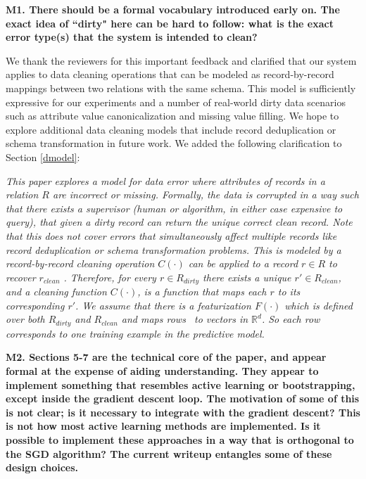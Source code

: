 \vspace{0.5em}

\noindent\noindent \textbf{M1. There should be a formal vocabulary introduced early on. The exact idea of ``dirty" here can be hard to follow: what is the exact error type(s) that the system is intended to clean?}

\vspace{0.5em}

We thank the reviewers for this important feedback and clarified that our system applies to data cleaning operations that can be modeled as record-by-record mappings between two relations with the same schema.
This model is sufficiently expressive for our experiments and a number of real-world dirty data scenarios such as attribute value canonicalization and missing value filling.
We hope to explore additional data cleaning models that include record deduplication or schema transformation in future work.
We added the following clarification to Section \ref{dmodel}:

\emph{This paper explores a model for data error where attributes of records in a relation $R$ are incorrect or missing.
Formally, the data is corrupted in a way such that there exists a supervisor (human or algorithm, in either case expensive to query), that given a dirty record can return the unique correct clean record.
Note that this does not cover errors that simultaneously affect multiple records like record deduplication or schema transformation problems.
This is modeled by a record-by-record cleaning operation $C(\cdot)$ can be applied to a record $r \in R$ to recover $r_{clean}$ .
Therefore, for every $r \in R_{dirty}$ there exists a unique $r' \in R_{clean}$, and a cleaning function $C(\cdot)$, is a function that maps each $r$ to its corresponding $r'$.
We assume that there is a featurization $F(\cdot)$ which is defined over both $R_{dirty}$ and $R_{clean}$ and maps rows~ to vectors in $\mathbb{R}^d$.
So each row~ corresponds to one training example in the predictive model.}

\vspace{0.5em}

\noindent\textbf{M2. Sections 5-7 are the technical core of the paper, and appear formal at the expense of aiding understanding. They appear to implement something that resembles active learning or bootstrapping, except inside the gradient descent loop. The motivation of some of this is not clear; is it necessary to integrate with the gradient descent? This is not how most active learning methods are implemented. Is it possible to implement these approaches in a way that is orthogonal to the SGD algorithm? The current writeup entangles some of these design choices.} 

